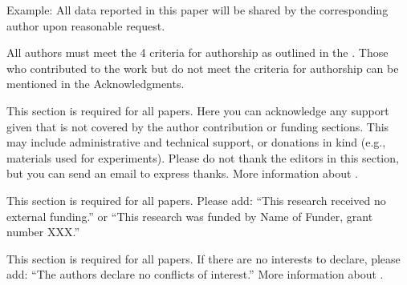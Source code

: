 \documentclass{ko-template}
\begin{document}
Example: All data reported in this paper will be shared by the corresponding author upon reasonable request.

All authors must meet the 4 criteria for authorship as outlined in the . Those who contributed to the work but do not meet the criteria for authorship can be mentioned in the Acknowledgments.


This section is required for all papers. Here you can acknowledge any support given that is not covered by the author contribution or funding sections. This may include administrative and technical support, or donations in kind (e.g., materials used for experiments). Please do not thank the editors in this section, but you can send an email to express thanks. More information about .


This section is required for all papers. Please add: “This research received no external funding.” or “This research was funded by Name of Funder, grant number XXX.”

This section is required for all papers. If there are no interests to declare, please add: “The authors declare no conflicts of interest.” More information about .
\end{document}
